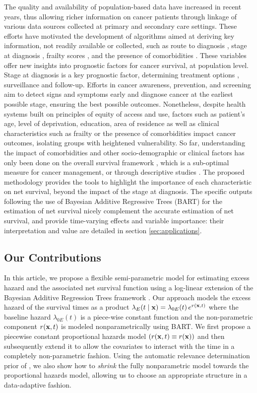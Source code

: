 \documentclass[12pt]{article}
\newcommand{\bfx}{{\bf x}}
\begin{document}
The quality and availability of population-based data have increased in recent years, thus allowing richer information on cancer patients through linkage of various data sources collected at primary and secondary care settings. These efforts have motivated the development of algorithms aimed at deriving key information, not readily available or collected, such as route to diagnosis \citep{elliss:2012}, stage at diagnosis \citep{benitez:2016}, frailty scores \citep{gilbert:2018}, and the presence of comorbidities \citep{maringe:2017}. These variables offer new insights into prognostic factors for cancer survival, at population level. Stage at diagnosis is a key prognostic factor, determining treatment options \citep{nice2020colorectal}, surveillance and follow-up. Efforts in cancer awareness, prevention, and screening aim to detect signs and symptoms early and diagnose cancer at the earliest possible stage, ensuring the best possible outcomes. Nonetheless, despite health systems built on principles of equity of access and use, factors such as patient's age, level of deprivation, education, area of residence as well as clinical characteristics such as frailty or the presence of comorbidities impact cancer outcomes, isolating groups with heightened vulnerability. So far, understanding the impact of comorbidities and other socio-demographic or clinical factors has only been done on the overall survival framework \citep{rubio:2022}, which is a sub-optimal measure for cancer management, or through descriptive studies \citep{michalopoulou:2021}. The proposed methodology provides the tools to highlight the importance of each characteristic on net survival, beyond the impact of the stage at diagnosis. The specific outputs following the use of Bayesian Additive Regressive Trees (BART) for the estimation of net survival nicely complement the accurate estimation of net survival, and provide time-varying effects and variable importance: their interpretation and value are detailed in section \ref{sec:applications}. 

\subsection{Our Contributions}

In this article, we propose a flexible semi-parametric model for estimating excess hazard and the associated net survival function using a log-linear extension of the Bayesian Additive Regression Trees framework \citep{chipman2010bart, hill2019bayesian}. Our approach models the excess hazard of the survival times as a product $\lambda_E(t \mid \bfx) = \lambda_{0E}(t) \, e^{r(\bfx, t)}$ where the baseline hazard $\lambda_{0E}(t)$ is a piece-wise constant function and the non-parametric component $r(\bfx, t)$ is modeled nonparametrically using BART.  We first propose a piecewise constant proportional hazards model $(r(\bfx, t) \equiv r(\bfx))$ and then subsequently extend it to allow the covariates to interact with the time in a completely non-parametric fashion. Using the automatic relevance determination prior of \citet{linero2016bayesian}, we also show how to \emph{shrink} the fully nonparametric model towards the proportional hazards model, allowing us to choose an appropriate structure in a data-adaptive fashion.
\end{document}
